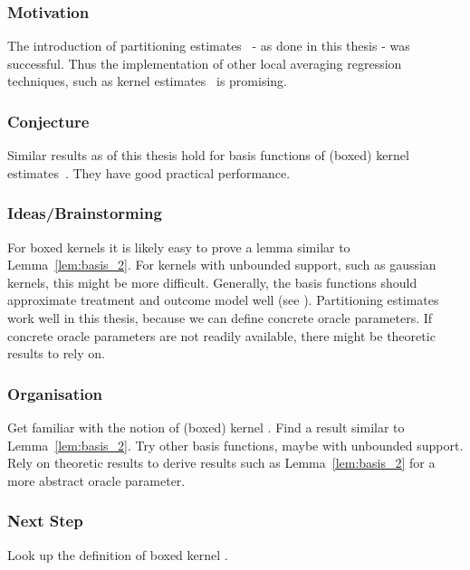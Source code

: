 \subsubsection{Motivation}
The introduction of partitioning estimates~\cite[§4]{Gyorfi2002} - as done in this thesis - was successful.
Thus the implementation of other local averaging regression techniques, such as kernel estimates~\cite[§5]{Gyorfi2002}
is promising. 
\subsubsection{Conjecture}
Similar results as of this thesis hold for basis functions of (boxed) kernel estimates~\cite[§5]{Gyorfi2002}.
They have good practical performance.
\subsubsection{Ideas/Brainstorming}
For boxed kernels it is likely easy to prove a lemma similar to Lemma~\ref{lem:basis_2}.
For kernels with unbounded support, such as gaussian kernels, this might be more difficult. 
Generally, the basis functions should approximate treatment and outcome model well (see \cite[Assumptions~1.6 \& 2.3]{Wang2019}).
Partitioning estimates work well in this thesis, because we can define concrete oracle parameters.
If concrete oracle parameters are not readily available, there might be theoretic results to rely on.
\subsubsection{Organisation}
Get familiar with the notion of (boxed) kernel \cite{Gyorfi2002}.
Find a result similar to Lemma~\ref{lem:basis_2}.
Try other basis functions, maybe with unbounded support.
Rely on theoretic results to derive results such as Lemma~\ref{lem:basis_2} for a more abstract oracle parameter.
\subsubsection{Next Step}
Look up the definition of boxed kernel \cite[Theorem~5.1, Figure~5.7]{Gyorfi2002}.
